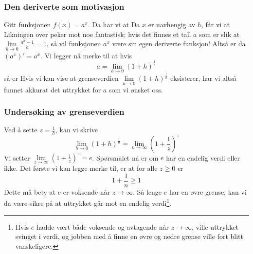 



	
\subsubsection{Den deriverte som motivasjon}
Gitt funksjonen $ f(x)=a^x $. Da har vi at
Da $ x $ er uavhengig av $ h $, får vi at
Likningen over peker mot noe fantastisk; hvis det finnes et tall $ a $ som er slik at $ {\lim\limits_{h\to 0}\frac{a^h-1}{h}=1} $, så vil funksjonen $ a^x $ være sin egen deriverte funksjon! Altså er da $ \left(a^x\right)'=a^x $. Vi legger nå merke til at hvis
\[ a=\lim\limits_{h\to 0}\left(1+h\right)^\frac{1}{h} \]
så er 
Hvis vi kan vise at grenseverdien $ \lim\limits_{h\to 0}\left(1+h\right)^\frac{1}{h} $ eksisterer, har vi altså funnet akkurat det uttrykket for $ a $ som vi ønsket oss.

\subsubsection{Undersøking av grenseverdien}
Ved å sette $ z=\frac{1}{h} $, kan vi skrive
\[ \lim\limits_{h\to0}(1+h)^\frac{1}{h}=\lim\limits_{n\to \infty}\left(1+\frac{1}{z}\right)^z \]
Vi setter $ {\lim\limits_{z\to \infty}\left(1+\frac{1}{z}\right)^z=e}  $. Spørsmålet nå er om $ e $ har en endelig verdi eller ikke. Det første vi kan legge merke til, er at for alle $ {z\geq0 }$ er
\[ 1+\frac{1}{n}\geq1  \]
Dette må bety at $ e $ er voksende når $ {z\to\infty} $. Så lenge $ e $ har en øvre grense, kan vi da være sikre på at uttrykket går mot en endelig verdi\footnote{Hvis $ e $ hadde vært både voksende og avtagende når $ {z\to\infty} $, ville uttrykket svinget i verdi, og jobben med å finne en øvre og nedre grense ville fort blitt vanskeligere.}.\vsk

